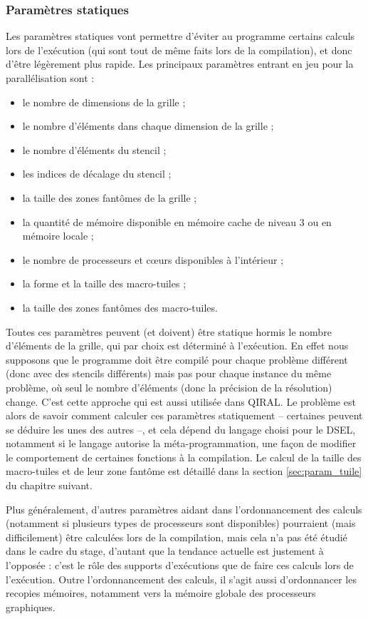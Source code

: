 \subsubsection*{Paramètres statiques}

Les paramètres statiques vont permettre d'éviter au programme certains calculs lors de l'exécution (qui sont tout de même faits lors de la compilation), et donc d'être légèrement plus rapide. Les principaux paramètres entrant en jeu pour la parallélisation sont :
\begin{itemize}
\item le nombre de dimensions de la grille ;
\item le nombre d'éléments dans chaque dimension de la grille ;
\item le nombre d'éléments du stencil ;
\item les indices de décalage du stencil ;
\item la taille des zones fantômes de la grille ;
\item la quantité de mémoire disponible en mémoire cache de niveau 3 ou en mémoire locale ;
\item le nombre de processeurs et cœurs disponibles à l'intérieur ;
\item la forme et la taille des macro-tuiles ;
\item la taille des zones fantômes des macro-tuiles.
\end{itemize}

Toutes ces paramètres peuvent (et doivent) être statique hormis le nombre d'éléments de la grille, qui par choix est déterminé à l'exécution. En effet nous supposons que le programme doit être compilé pour chaque problème différent (donc avec des stencils différents) mais pas pour chaque instance du même problème, où seul le nombre d'éléments (donc la précision de la résolution) change. C'est cette approche qui est aussi utilisée dans \textsf{QIRAL}. Le problème est alors de savoir comment calculer ces paramètres statiquement -- certaines peuvent se déduire les unes des autres --, et cela dépend du langage choisi pour le DSEL, notamment si le langage autorise la méta-programmation, une façon de modifier le comportement de certaines fonctions à la compilation. Le calcul de la taille des macro-tuiles et de leur zone fantôme est détaillé dans la section \ref{sec:param_tuile} du chapitre suivant.

Plus généralement, d'autres paramètres aidant dans l'ordonnancement des calculs (notamment si plusieurs types de processeurs sont disponibles) pourraient (mais difficilement) être calculées lors de la compilation, mais cela n'a pas été étudié dans le cadre du stage, d'autant que la tendance actuelle est justement à l'opposée : c'est le rôle des supports d'exécutions que de faire ces calculs lors de l'exécution. Outre l'ordonnancement des calculs, il s'agit aussi d'ordonnancer les recopies mémoires, notamment vers la mémoire globale des processeurs graphiques.



